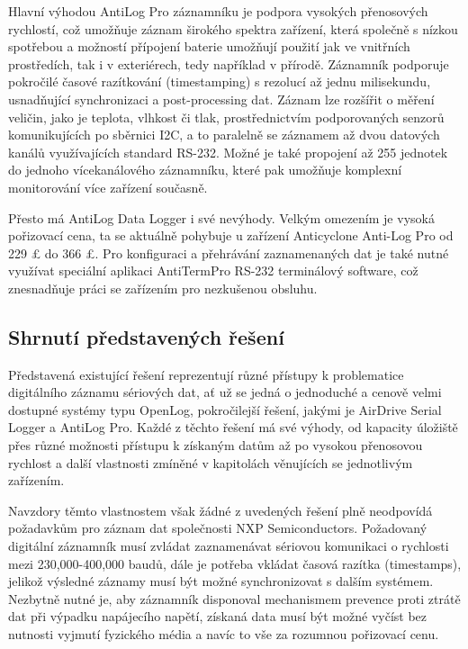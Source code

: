 Hlavní výhodou AntiLog Pro záznamníku je podpora vysokých přenosových rychlostí, což umožňuje záznam širokého spektra zařízení, která společně s nízkou spotřebou a možností přípojení baterie umožňují použití jak ve vnitřních prostředích, tak i v exteriérech, tedy například v přírodě. Záznamník podporuje pokročilé časové razítkování (timestamping) s rezolucí až jednu milisekundu, usnadňující synchronizaci a post-processing dat. Záznam lze rozšířit o měření veličin, jako je teplota, vlhkost či tlak, prostřednictvím podporovaných senzorů komunikujících po sběrnici I2C, a to paralelně se záznamem až dvou datových kanálů využívajících standard RS-232. Možné je také propojení až 255 jednotek do jednoho vícekanálového záznamníku, které pak umožňuje komplexní monitorování více zařízení současně. \cite{anticyclone_systems_antilog_pro, anticyclone_systems_antilog_pro_extended_logging}

Přesto má AntiLog Data Logger i své nevýhody. Velkým omezením je vysoká pořizovací cena, ta se aktuálně pohybuje u zařízení Anticyclone Anti-Log Pro od 229 £ do 366 £. Pro konfiguraci a přehrávání zaznamenaných dat je také nutné využívat speciální aplikaci AntiTermPro RS-232 terminálový software, což znesnadňuje práci se zařízením pro nezkušenou obsluhu.  \cite{anticyclone_systems_antilog_pro, anticyclone_systems_antilog_pro_price}

\subsection{Shrnutí představených řešení}

Představená existující řešení reprezentují různé přístupy k problematice digitálního záznamu sériových dat, ať už se jedná o jednoduché a cenově velmi dostupné systémy typu OpenLog, pokročilejší řešení, jakými je  AirDrive Serial Logger a AntiLog Pro. Každé z těchto řešení má své výhody, od kapacity úložiště přes různé možnosti přístupu k získaným datům až po vysokou přenosovou rychlost a další vlastnosti zmíněné v kapitolách věnujících se jednotlivým zařízením.

Navzdory těmto vlastnostem však žádné z uvedených řešení plně neodpovídá požadavkům pro záznam dat společnosti NXP Semiconductors. Požadovaný digitální záznamník musí zvládat zaznamenávat sériovou komunikaci o rychlosti mezi 230,000-400,000 baudů, dále je potřeba vkládat časová razítka (timestamps), jelikož výsledné záznamy musí být možné synchronizovat s dalším systémem. Nezbytně nutné je, aby záznamník disponoval mechanismem prevence proti ztrátě dat při výpadku napájecího napětí, získaná data musí být možné vyčíst bez nutnosti vyjmutí fyzického média a navíc to vše za rozumnou pořizovací cenu.

